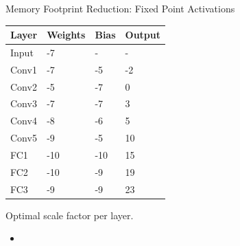 \begin{frame}{Memory Footprint Reduction: Fixed Point Activations}
	\begin{minipage}{0.6\textwidth}
		\centering
		\begin{table}
			\centering
			\begin{tabular}{llll}
				\toprule
				\textbf{Layer} & \textbf{Weights} & \textbf{Bias} & \textbf{Output} \\
				\midrule
				Input          & -7               & -             & -               \\
				Conv1          & -7               & -5            & -2              \\
				Conv2          & -5               & -7            & 0               \\
				Conv3          & -7               & -7            & 3               \\
				Conv4          & -8               & -6            & 5               \\
				Conv5          & -9               & -5            & 10              \\
				FC1            & -10              & -10           & 15              \\
				FC2            & -10              & -9            & 19              \\
				FC3            & -9               & -9            & 23              \\
				\bottomrule
			\end{tabular}
		\end{table}
	\end{minipage}%
	\begin{minipage}{0.4\textwidth}
		\large{Optimal scale factor per layer.}
	\end{minipage}
\end{frame}

\begin{frame}
	\begin{itemize}
		\item
	\end{itemize}
\end{frame}
